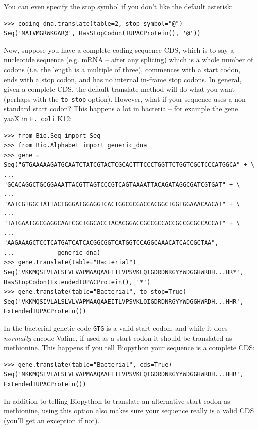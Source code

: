 \documentclass{report}
\begin{document}
You can even specify the stop symbol if you don't like the default asterisk:
\begin{verbatim}
>>> coding_dna.translate(table=2, stop_symbol="@")
Seq('MAIVMGRWKGAR@', HasStopCodon(IUPACProtein(), '@'))
\end{verbatim}

Now, suppose you have a complete coding sequence CDS, which is to say a
nucleotide sequence (e.g. mRNA -- after any splicing) which is a whole number
of codons (i.e. the length is a multiple of three), commences with a start
codon, ends with a stop codon, and has no internal in-frame stop codons.
In general, given a complete CDS, the default translate method will do what
you want (perhaps with the \verb|to_stop| option). However, what if your
sequence uses a non-standard start codon? This happens a lot in bacteria --
for example the gene yaaX in \texttt{E. coli} K12:

\begin{verbatim}
>>> from Bio.Seq import Seq
>>> from Bio.Alphabet import generic_dna
>>> gene = Seq("GTGAAAAAGATGCAATCTATCGTACTCGCACTTTCCCTGGTTCTGGTCGCTCCCATGGCA" + \
...            "GCACAGGCTGCGGAAATTACGTTAGTCCCGTCAGTAAAATTACAGATAGGCGATCGTGAT" + \
...            "AATCGTGGCTATTACTGGGATGGAGGTCACTGGCGCGACCACGGCTGGTGGAAACAACAT" + \
...            "TATGAATGGCGAGGCAATCGCTGGCACCTACACGGACCGCCGCCACCGCCGCGCCACCAT" + \
...            "AAGAAAGCTCCTCATGATCATCACGGCGGTCATGGTCCAGGCAAACATCACCGCTAA",
...            generic_dna)
>>> gene.translate(table="Bacterial")
Seq('VKKMQSIVLALSLVLVAPMAAQAAEITLVPSVKLQIGDRDNRGYYWDGGHWRDH...HR*',
HasStopCodon(ExtendedIUPACProtein(), '*')
>>> gene.translate(table="Bacterial", to_stop=True)
Seq('VKKMQSIVLALSLVLVAPMAAQAAEITLVPSVKLQIGDRDNRGYYWDGGHWRDH...HHR',
ExtendedIUPACProtein())
\end{verbatim}

\noindent In the bacterial genetic code \texttt{GTG} is a valid start codon,
and while it does \emph{normally} encode Valine, if used as a start codon it
should be translated as methionine. This happens if you tell Biopython your
sequence is a complete CDS:

\begin{verbatim}
>>> gene.translate(table="Bacterial", cds=True)
Seq('MKKMQSIVLALSLVLVAPMAAQAAEITLVPSVKLQIGDRDNRGYYWDGGHWRDH...HHR',
ExtendedIUPACProtein())
\end{verbatim}

In addition to telling Biopython to translate an alternative start codon as
methionine, using this option also makes sure your sequence really is a valid
CDS (you'll get an exception if not).
\end{document}
